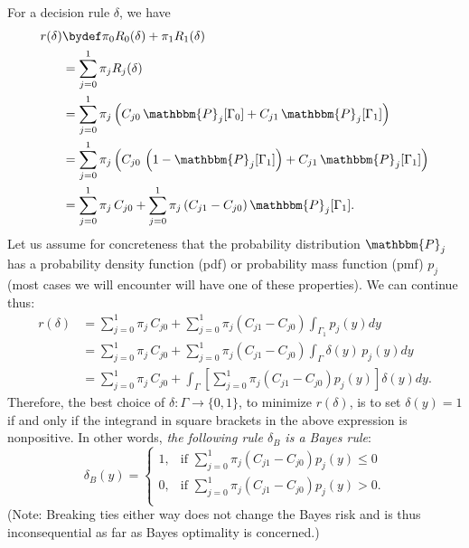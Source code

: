 \documentclass[12pt]{report}
\begin{document}
For a decision rule $\delta$, we have
\begin{align*}
r(\delta) &\bydef \pi_0 R_0(\delta) + \pi_1 R_1(\delta) \\
&= \sum_{j=0}^1 \pi_j R_j(\delta) \\
&= \sum_{j=0}^1 \pi_j \left( C_{j0} \, \mathbbm{P}_j[\Gamma_0] + C_{j1} \, \mathbbm{P}_j[\Gamma_1] \right) \\
&= \sum_{j=0}^1 \pi_j \left( C_{j0} \, \left(1 -  \mathbbm{P}_j[\Gamma_1] \right) + C_{j1} \, \mathbbm{P}_j[\Gamma_1] \right) \\
&= \sum_{j=0}^1  \pi_j \, C_{j0}  + \sum_{j=0}^1 \pi_j \left( C_{j1} - C_{j0} \right) \mathbbm{P}_j[\Gamma_1]. 
\end{align*}
Let us assume for concreteness that the probability distribution $\mathbbm{P}_j$ has a probability density function (pdf) or probability mass function (pmf) $p_j$ (most cases we will encounter will have one of these properties). We can continue thus: 
\begin{align*}
r(\delta) &= \sum_{j=0}^1  \pi_j \, C_{j0}  + \sum_{j=0}^1 \pi_j \left( C_{j1} - C_{j0} \right) \int_{\Gamma_1}p_j(y) dy \\
&= \sum_{j=0}^1  \pi_j \, C_{j0}  + \sum_{j=0}^1 \pi_j \left( C_{j1} - C_{j0} \right) \int_{\Gamma} \delta(y) \, p_j(y) dy \\
&= \sum_{j=0}^1  \pi_j \, C_{j0}  + \int_{\Gamma} \left[ \sum_{j=0}^1 \pi_j \left( C_{j1} - C_{j0} \right) p_j (y) \right]  \delta(y) dy.
\end{align*}
Therefore, the best choice of $\delta: \Gamma \to \{0,1\}$, to minimize $r(\delta)$, is to set $\delta(y) = 1$ if and only if the integrand in square brackets in the above expression is nonpositive. In other words, {\em the following rule $\delta_B$ is a Bayes rule}:
\[ \delta_B(y) = \left\{ 
\begin{array}{cc}
1, &  \text{if }\sum_{j=0}^1 \pi_j \left( C_{j1} - C_{j0} \right) p_j (y) \leq 0 \\
0, &  \text{if }\sum_{j=0}^1 \pi_j \left( C_{j1} - C_{j0} \right) p_j (y) > 0. \\
\end{array}
 \right. \]
 (Note: Breaking ties either way does not change the Bayes risk and is thus inconsequential as far as Bayes optimality is concerned.)




\end{document}
